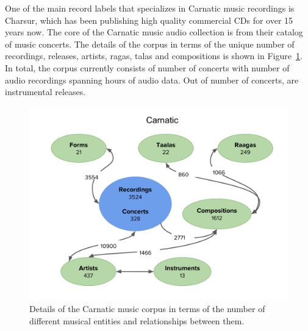 One of the main record labels that specializes in Carnatic music recordings is Charsur, which has been publishing high quality commercial CDs for over 15 years now. The core of the Carnatic music audio collection is from their catalog of music concerts. The details of the corpus in terms of the unique number of recordings, releases, artists, \glspl{raga}, \glspl{tala} and compositions is shown in Figure~\ref{fig:carnatic_corpus_details}. In total, the corpus currently consists of  number of concerts with  number of audio recordings spanning  hours of audio data. Out of  number of concerts,  are instrumental releases.

\begin{figure}
	\begin{center}
		\includegraphics[width=\figSizeHundred]{ch04_datasets/figures/carnatic_corpus.pdf}
	\end{center}
	\caption{Details of the Carnatic music corpus in terms of the number of different musical entities and relationships between them.}
	\label{fig:carnatic_corpus_details}
\end{figure}

